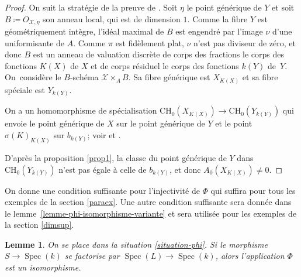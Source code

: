 \documentclass[JEP,XML,SOM,Unicode,francais,published]{cedram}
\newcommand{\CH}{\mathrm{CH}}
\newtheorem{lemma}[thm]{Lemme}
\theoremstyle{definition}
\newcommand{\Spec}{\operatorname{Spec}}
\newcommand{\mc}[1]{\mathcal{#1}}
\begin{document}
\begin{proof}
On suit la stratégie de la preuve de \cite[Th.\,1.12]{colliot2016hypersurfaces}. Soit $\eta$ le point générique de $Y$ et soit $B\coloneqq O_{\mc{X},\eta}$ son anneau local, qui est de dimension $1$. Comme la fibre $Y$ est géométriquement intègre, l'idéal maximal de $B$ est engendré par l'image $\nu$ d'une uniformisante de $A$. Comme $\pi$ est fidèlement plat, $\nu$ n'est pas diviseur de zéro, et donc $B$ est un anneau de valuation discrète de corps des fractions le corps des fonctions $K(X)$ de $X$ et de corps résiduel le corps des fonctions $k(Y)$ de~$Y$. On~considère le $B$-schéma ${\mathcal X}\times_{A}B$. Sa fibre générique est $X_{K(X)}$ et sa fibre spéciale est $Y_{k(Y)}$.

On a un homomorphisme de spécialisation
$\CH_{0}(X_{K(X)}) \to \CH_{0}(Y_{k(Y)})$
qui envoie le point générique de $X$ sur le point générique de $Y$ et le point $\sigma(K)_{K(X)}$ sur $b_{k(Y)}$; voir \cite{fulton1975rational} et \cite[\S 20.3]{fulton1998intersection}.

D'après la proposition \ref{prop1}, la classe du point générique de $Y$
dans $\CH_{0}(Y_{k(Y)})$ n'est pas
égale à celle de $b_{k(Y)} $,
et donc $A_{0}(X_{K(X)}) \neq 0$.
\end{proof}

On donne une condition suffisante pour l'injectivité de $\Phi$ qui suffira pour tous les exemples de la section \ref{paraex}. Une autre condition suffisante sera donnée dans le lemme~\ref{lemme-phi-isomorphisme-variante} et sera utilisée pour les exemples de la section \ref{dimsup}.

\begin{lemma}\label{lemme-phi-isomorphisme}
On se place dans la situation \ref{situation-phi}. Si le morphisme $S \to \Spec(k)$ se factorise par $\Spec(L) \to \Spec(k)$, alors l'application $\Phi$ est un isomorphisme.
\end{lemma}
\end{document}
